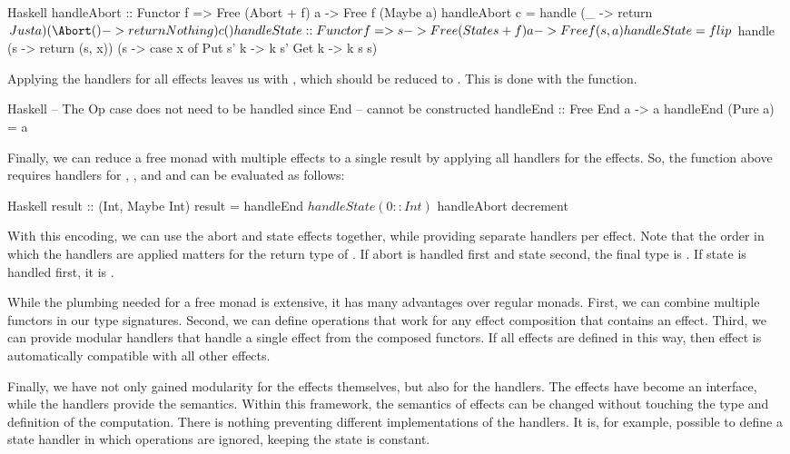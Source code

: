 \begin{lst}{Haskell}
handleAbort :: Functor f => Free (Abort + f) a -> Free f (Maybe a)
handleAbort c = handle
  (\a _ -> return $ Just a)
  (\Abort () -> return Nothing) 
  c ()
  
handleState :: Functor f => s -> Free (State s + f) a -> Free f (s, a)
handleState = flip $ handle
  (\x s -> return (s, x))
  (\x s -> case x of
      Put s' k -> k s'
      Get k -> k s s)
\end{lst}
%
Applying the handlers for all effects leaves us with , which should be reduced to . This is done with the  function.

\begin{lst}{Haskell}
-- The Op case does not need to be handled since End
-- cannot be constructed
handleEnd :: Free End a -> a
handleEnd (Pure a) = a
\end{lst}
%
Finally, we can reduce a free monad with multiple effects to a single result by applying all handlers for the effects. So, the  function above requires handlers for , , and  and can be evaluated as follows:

\begin{lst}{Haskell}
result :: (Int, Maybe Int)
result = handleEnd $ handleState (0::Int) $ handleAbort decrement  
\end{lst}
%
With this encoding, we can use the abort and state effects together, while providing separate handlers per effect. Note that the order in which the handlers are applied matters for the return type of . If abort is handled first and state second, the final type is . If state is handled first, it is .

While the plumbing needed for a free monad is extensive, it has many advantages over regular monads. First, we can combine multiple functors in our type signatures. Second, we can define operations that work for any effect composition that contains an effect. Third, we can provide modular handlers that handle a single effect from the composed functors. If all effects are defined in this way, then effect is automatically compatible with all other effects.

Finally, we have not only gained modularity for the effects themselves, but also for the handlers. The effects have become an interface, while the handlers provide the semantics. Within this framework, the semantics of effects can be changed without touching the type and definition of the computation. There is nothing preventing different implementations of the handlers. It is, for example, possible to define a state handler in which  operations are ignored, keeping the state is constant.

